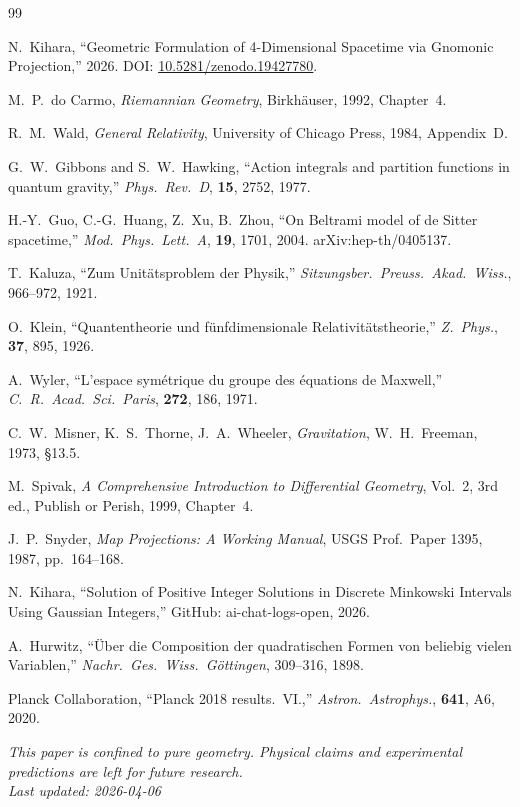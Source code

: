 \documentclass[12pt,a4paper]{article}
\begin{document}
\begin{thebibliography}{99}

N.~Kihara, ``Geometric Formulation of 4-Dimensional Spacetime via Gnomonic Projection,'' 2026.
DOI: \href{https://doi.org/10.5281/zenodo.19427780}{10.5281/zenodo.19427780}.

M.~P.~do Carmo, \textit{Riemannian Geometry}, Birkh\"{a}user, 1992, Chapter~4.

R.~M.~Wald, \textit{General Relativity}, University of Chicago Press, 1984, Appendix~D.

G.~W.~Gibbons and S.~W.~Hawking, ``Action integrals and partition functions in quantum gravity,'' \textit{Phys.\ Rev.\ D}, \textbf{15}, 2752, 1977.

H.-Y.~Guo, C.-G.~Huang, Z.~Xu, B.~Zhou, ``On Beltrami model of de Sitter spacetime,'' \textit{Mod.\ Phys.\ Lett.\ A}, \textbf{19}, 1701, 2004. arXiv:hep-th/0405137.

T.~Kaluza, ``Zum Unit\"{a}tsproblem der Physik,'' \textit{Sitzungsber.\ Preuss.\ Akad.\ Wiss.}, 966--972, 1921.

O.~Klein, ``Quantentheorie und f\"{u}nfdimensionale Relativit\"{a}tstheorie,'' \textit{Z.\ Phys.}, \textbf{37}, 895, 1926.

A.~Wyler, ``L'espace sym\'{e}trique du groupe des \'{e}quations de Maxwell,'' \textit{C.\ R.\ Acad.\ Sci.\ Paris}, \textbf{272}, 186, 1971.

C.~W.~Misner, K.~S.~Thorne, J.~A.~Wheeler, \textit{Gravitation}, W.~H.~Freeman, 1973, \S13.5.

M.~Spivak, \textit{A Comprehensive Introduction to Differential Geometry}, Vol.~2, 3rd ed., Publish or Perish, 1999, Chapter~4.

J.~P.~Snyder, \textit{Map Projections: A Working Manual}, USGS Prof.\ Paper 1395, 1987, pp.~164--168.

N.~Kihara, ``Solution of Positive Integer Solutions in Discrete Minkowski Intervals Using Gaussian Integers,'' GitHub: ai-chat-logs-open, 2026.

A.~Hurwitz, ``\"{U}ber die Composition der quadratischen Formen von beliebig vielen Variablen,'' \textit{Nachr.\ Ges.\ Wiss.\ G\"{o}ttingen}, 309--316, 1898.

Planck Collaboration, ``Planck 2018 results.~VI.,'' \textit{Astron.\ Astrophys.}, \textbf{641}, A6, 2020.

\end{thebibliography}

\bigskip
\noindent\textit{This paper is confined to pure geometry. Physical claims and experimental predictions are left for future research.}\\
\textit{Last updated: 2026-04-06}
\end{document}
